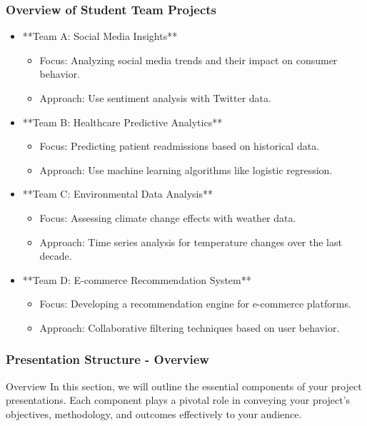\documentclass{beamer}
\begin{document}
\begin{frame}[fragile]
    \frametitle{Overview of Student Team Projects}
    \begin{itemize}
        \item **Team A: Social Media Insights**
            \begin{itemize}
                \item Focus: Analyzing social media trends and their impact on consumer behavior.
                \item Approach: Use sentiment analysis with Twitter data.
            \end{itemize}
        
        \item **Team B: Healthcare Predictive Analytics**
            \begin{itemize}
                \item Focus: Predicting patient readmissions based on historical data.
                \item Approach: Use machine learning algorithms like logistic regression.
            \end{itemize}
        
        \item **Team C: Environmental Data Analysis**
            \begin{itemize}
                \item Focus: Assessing climate change effects with weather data.
                \item Approach: Time series analysis for temperature changes over the last decade.
            \end{itemize}
        
        \item **Team D: E-commerce Recommendation System**
            \begin{itemize}
                \item Focus: Developing a recommendation engine for e-commerce platforms.
                \item Approach: Collaborative filtering techniques based on user behavior.
            \end{itemize}
    \end{itemize}
\end{frame}

\begin{frame}[fragile]
    \frametitle{Presentation Structure - Overview}
    \begin{block}{Overview}
        In this section, we will outline the essential components of your project presentations. Each component plays a pivotal role in conveying your project's objectives, methodology, and outcomes effectively to your audience.
    \end{block}
\end{frame}
\end{document}
